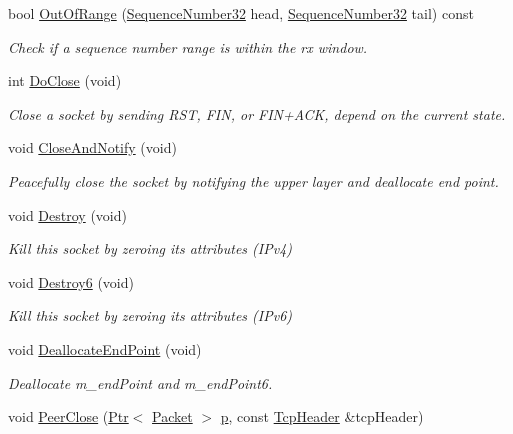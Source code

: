 \begin{DoxyCompactItemize}
bool \hyperlink{classns3_1_1TcpSocketBase_a99af6d09e114652b31187db88da577b6}{Out\+Of\+Range} (\hyperlink{group__network_gacb2070e4e98d2d5135c9bede58f07a03}{Sequence\+Number32} head, \hyperlink{group__network_gacb2070e4e98d2d5135c9bede58f07a03}{Sequence\+Number32} tail) const 
\begin{DoxyCompactList}\small\item\em Check if a sequence number range is within the rx window. \end{DoxyCompactList}\item 
int \hyperlink{classns3_1_1TcpSocketBase_adfc92c152f498c918cd73d4b31579472}{Do\+Close} (void)
\begin{DoxyCompactList}\small\item\em Close a socket by sending R\+ST, F\+IN, or F\+I\+N+\+A\+CK, depend on the current state. \end{DoxyCompactList}\item 
void \hyperlink{classns3_1_1TcpSocketBase_a04354f05482d826576740fd2f1691818}{Close\+And\+Notify} (void)
\begin{DoxyCompactList}\small\item\em Peacefully close the socket by notifying the upper layer and deallocate end point. \end{DoxyCompactList}\item 
void \hyperlink{classns3_1_1TcpSocketBase_aa0171ac255369c09a30144b1a5f6b21d}{Destroy} (void)
\begin{DoxyCompactList}\small\item\em Kill this socket by zeroing its attributes (I\+Pv4) \end{DoxyCompactList}\item 
void \hyperlink{classns3_1_1TcpSocketBase_a194e921d823fdfd396fa64aa524a0326}{Destroy6} (void)
\begin{DoxyCompactList}\small\item\em Kill this socket by zeroing its attributes (I\+Pv6) \end{DoxyCompactList}\item 
void \hyperlink{classns3_1_1TcpSocketBase_a53791738228495d40197679dbc057392}{Deallocate\+End\+Point} (void)
\begin{DoxyCompactList}\small\item\em Deallocate m\+\_\+end\+Point and m\+\_\+end\+Point6. \end{DoxyCompactList}\item 
void \hyperlink{classns3_1_1TcpSocketBase_a417d981796bf0919582c843403f823ad}{Peer\+Close} (\hyperlink{classns3_1_1Ptr}{Ptr}$<$ \hyperlink{classns3_1_1Packet}{Packet} $>$ \hyperlink{lte__link__budget__x2__handover__measures_8m_ac9de518908a968428863f829398a4e62}{p}, const \hyperlink{classns3_1_1TcpHeader}{Tcp\+Header} \&tcp\+Header)

\end{DoxyCompactItemize}
